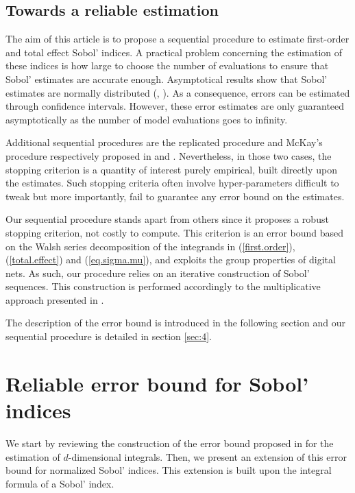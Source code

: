 \subsection{Towards a reliable estimation}
\label{sec:2.3}
The aim of this article is to propose a sequential procedure to estimate first-order and total effect Sobol' indices.  A practical problem concerning the estimation of these indices is how large to choose the number of evaluations to ensure that Sobol' estimates are accurate enough. Asymptotical results show that Sobol' estimates are normally distributed (\cite[Proposition 2.2]{Janon}, \cite[Proposition 3.5]{Tissot}). As a consequence, errors can be estimated through confidence intervals. However, these error estimates are only guaranteed asymptotically as the number of model evaluations goes to infinity.

Additional sequential procedures are the replicated procedure and McKay's procedure respectively proposed in \cite{Gilquin.rec} and \cite{Tong}. Nevertheless, in those two cases, the stopping criterion is a quantity of interest purely empirical, built directly upon the estimates. Such stopping criteria often involve hyper-parameters difficult to tweak but more importantly, fail to guarantee any error bound on the estimates. 

Our sequential procedure stands apart from others since it proposes a robust stopping criterion, not costly to compute. This criterion is an error bound based on the Walsh series decomposition of the integrands in (\ref{first.order}), (\ref{total.effect}) and (\ref{eq.sigma.mu}), and exploits the group properties of digital nets. As such, our procedure relies on an iterative construction of Sobol' sequences. This construction is performed accordingly to the multiplicative approach presented in \cite{GJAHMP}.

The description of the error bound is introduced in the following section and our sequential procedure is detailed in section \ref{sec:4}.


\section{Reliable error bound for Sobol' indices}
\label{sec:3} 
We start by reviewing the construction of the error bound proposed in \cite{HicJim} for the estimation of $d$-dimensional integrals. Then, we present an extension of this error bound for normalized Sobol' indices. This extension is built upon the integral formula of a Sobol' index.

